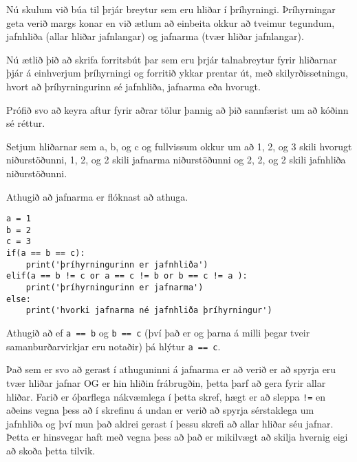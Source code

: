 \begin{exercise}\label{exp4}
Nú skulum við búa til þrjár breytur sem eru hliðar í þríhyrningi.
Þríhyrningar geta verið margs konar en við ætlum að einbeita okkur að tveimur tegundum, jafnhliða (allar hliðar jafnlangar) og jafnarma (tvær hliðar jafnlangar).

Nú ætlið þið að skrifa forritsbút þar sem eru þrjár talnabreytur fyrir hliðarnar þjár á einhverjum þríhyrningi og forritið ykkar prentar út, með skilyrðissetningu, hvort að þríhyrningurinn sé jafnhliða, jafnarma eða hvorugt.

Prófið svo að keyra aftur fyrir aðrar tölur þannig að þið sannfærist um að kóðinn sé réttur.
\end{exercise}
\begin{Answer}[ref={exp4}]
Setjum hliðarnar sem a, b, og c og fullvissum okkur um að 1, 2, og 3 skili hvorugt niðurstöðunni, 1, 2, og 2 skili jafnarma niðurstöðunni og 2, 2, og 2 skili jafnhliða niðurstöðunni.

Athugið að jafnarma er flóknast að athuga.
	\begin{lstlisting}
a = 1
b = 2
c = 3
if(a == b == c):
	print('þríhyrningurinn er jafnhliða')
elif(a == b != c or a == c != b or b == c != a ):
	print('þríhyrningurinn er jafnarma')
else:
	print('hvorki jafnarma né jafnhliða þríhyrningur')\end{lstlisting}

Athugið að ef \texttt{a == b} og \texttt{b == c} (því það er og þarna á milli þegar tveir samanburðarvirkjar eru notaðir) þá hlýtur \texttt{a == c}.

Það sem er svo að gerast í athuguninni á jafnarma er að verið er að spyrja eru tvær hliðar jafnar OG er hin hliðin frábrugðin, þetta þarf að gera fyrir allar hliðar.
Farið er óþarflega nákvæmlega í þetta skref, hægt er að sleppa \texttt{!=} en aðeins vegna þess að í skrefinu á undan er verið að spyrja sérstaklega um jafnhliða og því mun það aldrei gerast í þessu skrefi að allar hliðar séu jafnar.
Þetta er hinsvegar haft með vegna þess að það er mikilvægt að skilja hvernig eigi að skoða þetta tilvik.
\end{Answer}

